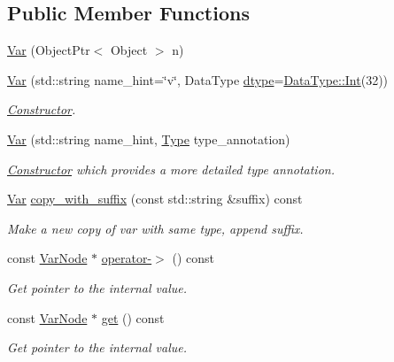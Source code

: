 \subsection*{Public Member Functions}
\begin{DoxyCompactItemize}
\item 
\hyperlink{classtvm_1_1tir_1_1Var_a21ba7568a83bfc2a5896f9e0ff181129}{Var} (Object\+Ptr$<$ Object $>$ n)
\item 
\hyperlink{classtvm_1_1tir_1_1Var_a04d3346f5887ed96b8ba1c130d9393eb}{Var} (std\+::string name\+\_\+hint=\char`\"{}v\char`\"{}, Data\+Type \hyperlink{classtvm_1_1PrimExpr_a1098008618699c33adfbd19e582f9ffd}{dtype}=\hyperlink{classtvm_1_1runtime_1_1DataType_ab45f13dd70d982d9f977c79b6f7fac98}{Data\+Type\+::\+Int}(32))
\begin{DoxyCompactList}\small\item\em \hyperlink{classtvm_1_1Constructor}{Constructor}. \end{DoxyCompactList}\item 
\hyperlink{classtvm_1_1tir_1_1Var_a435e58da4d11329d9cb70ce77a15f78d}{Var} (std\+::string name\+\_\+hint, \hyperlink{classtvm_1_1Type}{Type} type\+\_\+annotation)
\begin{DoxyCompactList}\small\item\em \hyperlink{classtvm_1_1Constructor}{Constructor} which provides a more detailed type annotation. \end{DoxyCompactList}\item 
\hyperlink{classtvm_1_1tir_1_1Var}{Var} \hyperlink{classtvm_1_1tir_1_1Var_a614c7820e199ca7251bc64cac4210465}{copy\+\_\+with\+\_\+suffix} (const std\+::string \&suffix) const 
\begin{DoxyCompactList}\small\item\em Make a new copy of var with same type, append suffix. \end{DoxyCompactList}\item 
const \hyperlink{classtvm_1_1tir_1_1VarNode}{Var\+Node} $\ast$ \hyperlink{classtvm_1_1tir_1_1Var_a15138d962c7fee302e1024cafe05b15a}{operator-\/$>$} () const 
\begin{DoxyCompactList}\small\item\em Get pointer to the internal value. \end{DoxyCompactList}\item 
const \hyperlink{classtvm_1_1tir_1_1VarNode}{Var\+Node} $\ast$ \hyperlink{classtvm_1_1tir_1_1Var_a73a8df326077f135e3d97ea428bbe785}{get} () const 
\begin{DoxyCompactList}\small\item\em Get pointer to the internal value. \end{DoxyCompactList}\end{DoxyCompactItemize}


